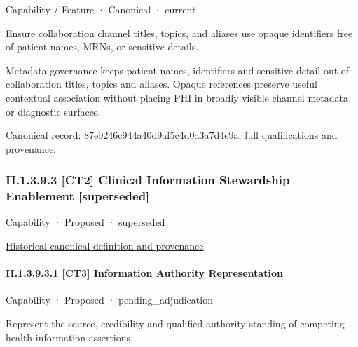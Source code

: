 \label{element:87e9246c944a40d9af5c4d0a3a7d4e9a}
{\small Capability / Feature · Canonical · current}\par

Ensure collaboration channel titles, topics, and aliases use opaque identifiers free of patient names, MRNs, or sensitive details.



Metadata governance keeps patient names, identifiers and sensitive detail out of collaboration titles, topics and aliases. Opaque references preserve useful contextual association without placing PHI in broadly visible channel metadata or diagnostic surfaces.


{\footnotesize \href{../../../../continuum/strategy/capability/feature/87e9246c944a40d9af5c4d0a3a7d4e9a.md}{Canonical record: 87e9246c944a40d9af5c4d0a3a7d4e9a}; full qualifications and provenance.}\par
\subsubsection*{II.1.3.9.3 [CT2] Clinical Information Stewardship Enablement [superseded]}
\label{navigation:II.1.3.9.3}

\label{element:3811c758ff2140c39a801bf89f75098a}
{\small Capability · Proposed · superseded}\par
\href{../../../../continuum/strategy/capability/3811c758ff2140c39a801bf89f75098a.md}{Historical canonical definition and provenance}.\par
\paragraph*{II.1.3.9.3.1 [CT3] Information Authority Representation}
\label{navigation:II.1.3.9.3.1}

\label{element:8c850faafb334f97a81a0b4cd8fdb65f}
{\small Capability · Proposed · pending\_adjudication}\par

Represent the source, credibility and qualified authority standing of competing health-information assertions.



